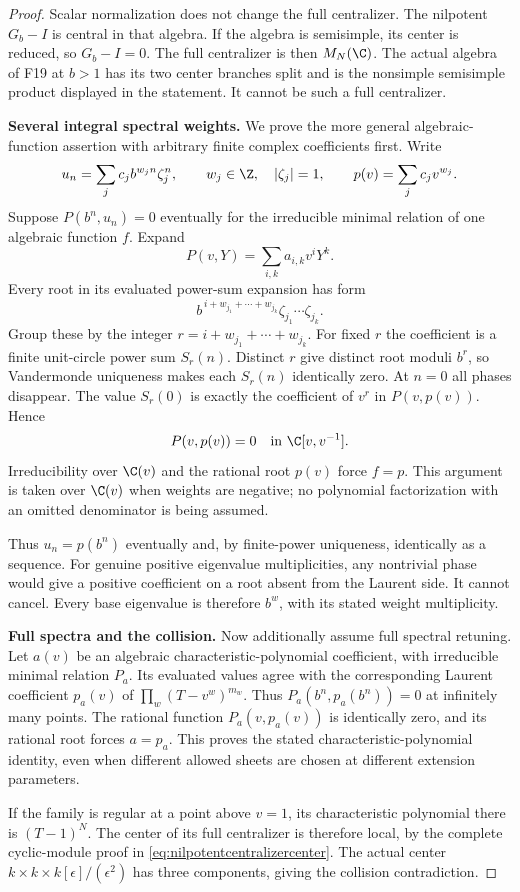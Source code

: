 \documentclass[11pt,a4paper]{article}
\newcommand{\fid}[1]{\textsf{#1}}\newcommand{\gate}[1]{\textsf{#1}}
\theoremstyle{named}\newtheorem{finding}{Finding}[section]
\theoremstyle{definition}\newtheorem{definition}[finding]{Definition}
\theoremstyle{remark}\newtheorem{remark}[finding]{Remark}
\begin{document}
\begin{proof}
Scalar normalization does not change the full centralizer.
The nilpotent $G_b-I$ is central in that algebra.
If the algebra is semisimple, its center is reduced,
so $G_b-I=0$.
The full centralizer is then $M_N(\C)$.
The actual algebra of \fid{F19} at $b>1$ has its two
center branches split and is the nonsimple semisimple
product displayed in the statement. It cannot be
such a full centralizer.

\par\smallskip\noindent\textbf{Several integral spectral weights.}\quad
We prove the more general algebraic-function assertion
with arbitrary finite complex coefficients first.
Write
\[
 u_n=\sum_j c_j b^{w_jn}\zeta_j^n,\qquad
 w_j\in\Z,\quad |\zeta_j|=1,
 \qquad p(v)=\sum_j c_jv^{w_j}.
\]
Suppose $P(b^n,u_n)=0$ eventually for the irreducible
minimal relation of one algebraic function $f$.
Expand
\[
 P(v,Y)=\sum_{i,k}a_{i,k}v^iY^k.
\]
Every root in its evaluated power-sum expansion has form
\[
 b^{\,i+w_{j_1}+\cdots+w_{j_k}}
       \zeta_{j_1}\cdots\zeta_{j_k}.
\]
Group these by the integer
$r=i+w_{j_1}+\cdots+w_{j_k}$.
For fixed $r$ the coefficient is a finite unit-circle
power sum $S_r(n)$.
Distinct $r$ give distinct root moduli $b^r$, so
Vandermonde uniqueness makes each $S_r(n)$ identically
zero. At $n=0$ all phases disappear.
The value $S_r(0)$ is exactly the coefficient of $v^r$
in $P(v,p(v))$. Hence
\[
 P(v,p(v))=0\quad\hbox{in }\C[v,v^{-1}].
\]
Irreducibility over $\C(v)$ and the rational root $p(v)$
force $f=p$.
This argument is taken over $\C(v)$ when weights are
negative; no polynomial factorization with an omitted
denominator is being assumed.

Thus $u_n=p(b^n)$ eventually and, by finite-power
uniqueness, identically as a sequence.
For genuine positive eigenvalue multiplicities, any
nontrivial phase would give a positive coefficient on
a root absent from the Laurent side. It cannot cancel.
Every base eigenvalue is therefore $b^w$, with its
stated weight multiplicity.

\par\smallskip\noindent\textbf{Full spectra and the collision.}\quad
Now additionally assume full spectral retuning.
Let $a(v)$ be an algebraic characteristic-polynomial
coefficient, with irreducible minimal relation $P_a$.
Its evaluated values agree with the corresponding
Laurent coefficient $p_a(v)$ of
$\prod_w(T-v^w)^{m_w}$.
Thus $P_a(b^n,p_a(b^n))=0$ at infinitely many points.
The rational function $P_a(v,p_a(v))$ is identically
zero, and its rational root forces $a=p_a$.
This proves the stated characteristic-polynomial identity,
even when different allowed sheets are chosen at
different extension parameters.

If the family is regular at a point above $v=1$,
its characteristic polynomial there is $(T-1)^N$.
The center of its full centralizer is therefore local,
by the complete cyclic-module proof in
\eqref{eq:nilpotentcentralizercenter}.
The actual center
$k\times k\times k[\epsilon]/(\epsilon^2)$
has three components, giving the collision contradiction.
\end{proof}
\end{document}
